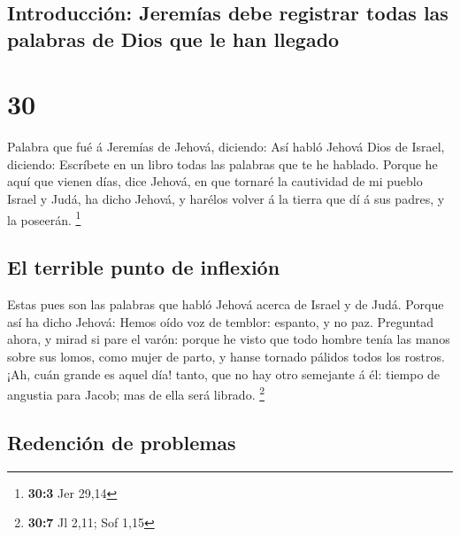 \hypertarget{introducciuxf3n-jeremuxedas-debe-registrar-todas-las-palabras-de-dios-que-le-han-llegado}{%
\subsection{Introducción: Jeremías debe registrar todas las palabras de
Dios que le han
llegado}\label{introducciuxf3n-jeremuxedas-debe-registrar-todas-las-palabras-de-dios-que-le-han-llegado}}

\hypertarget{section-29}{%
\section{30}\label{section-29}}

 Palabra que fué á Jeremías de Jehová, diciendo:
 Así habló Jehová Dios de Israel, diciendo: Escríbete en
un libro todas las palabras que te he hablado.  Porque he
aquí que vienen días, dice Jehová, en que tornaré la cautividad de mi
pueblo Israel y Judá, ha dicho Jehová, y harélos volver á la tierra que
dí á sus padres, y la poseerán. \footnote{\textbf{30:3} Jer 29,14}

\hypertarget{el-terrible-punto-de-inflexiuxf3n}{%
\subsection{El terrible punto de
inflexión}\label{el-terrible-punto-de-inflexiuxf3n}}

 Estas pues son las palabras que habló Jehová acerca de
Israel y de Judá.  Porque así ha dicho Jehová: Hemos oído
voz de temblor: espanto, y no paz.  Preguntad ahora, y
mirad si pare el varón: porque he visto que todo hombre tenía las manos
sobre sus lomos, como mujer de parto, y hanse tornado pálidos todos los
rostros.  ¡Ah, cuán grande es aquel día! tanto, que no hay
otro semejante á él: tiempo de angustia para Jacob; mas de ella será
librado. \footnote{\textbf{30:7} Jl 2,11; Sof 1,15}

\hypertarget{redenciuxf3n-de-problemas}{%
\subsection{Redención de problemas}\label{redenciuxf3n-de-problemas}}

